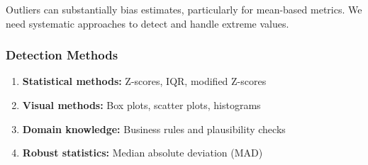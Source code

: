 Outliers can substantially bias estimates, particularly for mean-based metrics. We need systematic approaches to detect and handle extreme values.

\subsubsection{Detection Methods}

\begin{enumerate}
    \item \textbf{Statistical methods:} Z-scores, IQR, modified Z-scores
    \item \textbf{Visual methods:} Box plots, scatter plots, histograms
    \item \textbf{Domain knowledge:} Business rules and plausibility checks
    \item \textbf{Robust statistics:} Median absolute deviation (MAD)
\end{enumerate}

